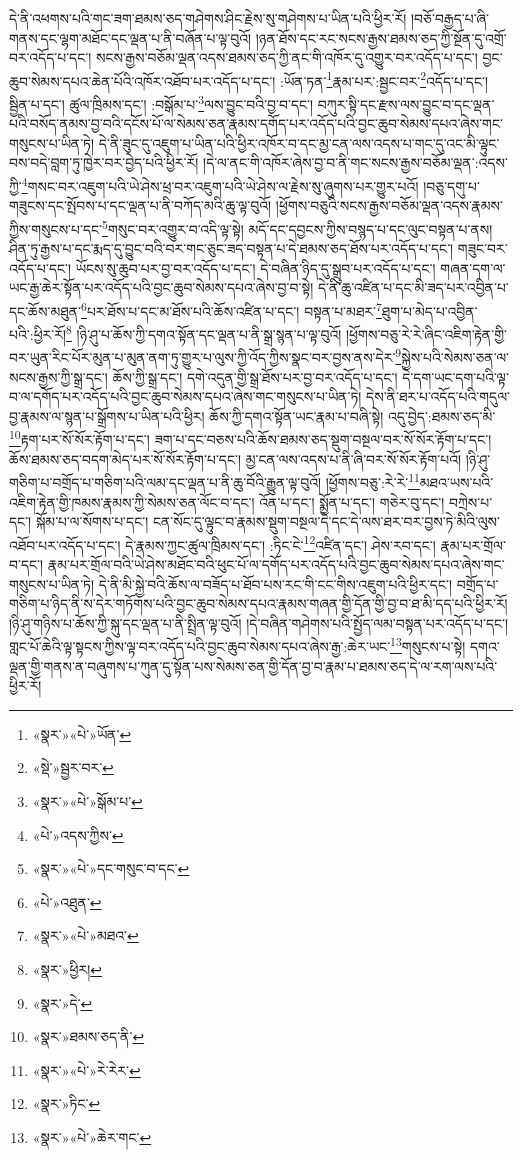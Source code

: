 དེ་ནི་འཕགས་པའི་གང་ཟག་ཐམས་ཅད་གཤེགས་ཤིང་རྗེས་སུ་གཤེགས་པ་ཡིན་པའི་ཕྱིར་རོ། །བཅོ་བརྒྱད་པ་ཞི་གནས་དང་ལྷག་མཐོང་དང་ལྡན་པ་ནི་བཞོན་པ་ལྟ་བུའོ། །ཉན་ཐོས་དང་རང་སངས་རྒྱས་ཐམས་ཅད་ཀྱི་སྔོན་དུ་འགྲོ་བར་འདོད་པ་དང་། སངས་རྒྱས་བཅོམ་ལྡན་འདས་ཐམས་ཅད་ཀྱི་ནང་གི་འཁོར་དུ་འགྱུར་བར་འདོད་པ་དང་། བྱང་ཆུབ་སེམས་དཔའ་ཆེན་པོའི་འཁོར་འཐོབ་པར་འདོད་པ་དང་། :ཡོན་ཏན་\footnote{«སྣར་»«པེ་»ཡོན་}རྣམ་པར་:སྦྱང་བར་\footnote{«སྡེ་»སྦྱར་བར་}འདོད་པ་དང་། སྦྱིན་པ་དང་། ཚུལ་ཁྲིམས་དང་། :བསྒོམ་པ་\footnote{«སྣར་»«པེ་»སྒོམ་པ་}ལས་བྱུང་བའི་བྱ་བ་དང་། བཀུར་སྟི་དང་རྫས་ལས་བྱུང་བ་དང་ལྡན་པའི་བསོད་ནམས་བྱ་བའི་དངོས་པོ་ལ་སེམས་ཅན་རྣམས་དགོད་པར་འདོད་པའི་བྱང་ཆུབ་སེམས་དཔའ་ཞེས་གང་གསུངས་པ་ཡིན་ཏེ། དེ་ནི་ཟུང་དུ་འཇུག་པ་ཡིན་པའི་ཕྱིར་འཁོར་བ་དང་མྱ་ངན་ལས་འདས་པ་གང་དུ་འང་མི་ལྟུང་བས་བདེ་བླག་ཏུ་ཁྱེར་བར་བྱེད་པའི་ཕྱིར་རོ། །དེ་ལ་ནང་གི་འཁོར་ཞེས་བྱ་བ་ནི་གང་སངས་རྒྱས་བཅོམ་ལྡན་:འདས་ཀྱི་\footnote{«པེ་»འདས་ཀྱིས་}གསང་བར་འཇུག་པའི་ཡེ་ཤེས་ཕྲ་བར་འཇུག་པའི་ཡེ་ཤེས་ལ་རྗེས་སུ་ཞུགས་པར་གྱུར་པའོ། །བཅུ་དགུ་པ་གཟུངས་དང་སྤོབས་པ་དང་ལྡན་པ་ནི་བཀོད་མའི་ཆུ་ལྟ་བུའོ། །ཕྱོགས་བཅུའི་སངས་རྒྱས་བཅོམ་ལྡན་འདས་རྣམས་ཀྱིས་གསུངས་པ་དང་\footnote{«སྣར་»«པེ་»དང་གསུང་བ་དང་}གསུང་བར་འགྱུར་བ་འདི་ལྟ་སྟེ། མདོ་དང་དབྱངས་ཀྱིས་བསྙད་པ་དང་ལུང་བསྟན་པ་ནས། ཤིན་ཏུ་རྒྱས་པ་དང་རྨད་དུ་བྱུང་བའི་བར་གང་ཅུང་ཟད་བསྟན་པ་དེ་ཐམས་ཅད་ཐོས་པར་འདོད་པ་དང་། གཟུང་བར་འདོད་པ་དང་། ཡོངས་སུ་ཆུབ་པར་བྱ་བར་འདོད་པ་དང་། དེ་བཞིན་ཉིད་དུ་སྒྲུབ་པར་འདོད་པ་དང་། གཞན་དག་ལ་ཡང་རྒྱ་ཆེར་སྟོན་པར་འདོད་པའི་བྱང་ཆུབ་སེམས་དཔའ་ཞེས་བྱ་བ་སྟེ། དེ་ནི་ཆུ་འཛིན་པ་དང་མི་ཟད་པར་འབྱིན་པ་དང་ཆོས་མཐུན་\footnote{«པེ་»འཐུན་}པར་ཐོས་པ་དང་མ་ཐོས་པའི་ཆོས་འཛིན་པ་དང་། བསྟན་པ་མཐར་\footnote{«སྣར་»«པེ་»མཐའ་}ཐུག་པ་མེད་པ་འབྱིན་པའི་:ཕྱིར་རོ།\footnote{«སྣར་»ཕྱིར།} །ཉི་ཤུ་པ་ཆོས་ཀྱི་དགའ་སྟོན་དང་ལྡན་པ་ནི་སྒྲ་སྙན་པ་ལྟ་བུའོ། །ཕྱོགས་བཅུ་རེ་རེ་ཞིང་འཇིག་རྟེན་གྱི་བར་ཡུན་རིང་པོར་མུན་པ་མུན་ནག་ཏུ་གྱུར་པ་ལུས་ཀྱི་འོད་ཀྱིས་སྣང་བར་བྱས་ནས་དེར་\footnote{«སྣར་»དེ་}སྐྱེས་པའི་སེམས་ཅན་ལ་སངས་རྒྱས་ཀྱི་སྒྲ་དང་། ཆོས་ཀྱི་སྒྲ་དང་། དགེ་འདུན་གྱི་སྒྲ་ཐོས་པར་བྱ་བར་འདོད་པ་དང་། དེ་དག་ཡང་དག་པའི་ལྟ་བ་ལ་དགོད་པར་འདོད་པའི་བྱང་ཆུབ་སེམས་དཔའ་ཞེས་གང་གསུངས་པ་ཡིན་ཏེ། དེས་ནི་ཐར་པ་འདོད་པའི་གདུལ་བྱ་རྣམས་ལ་སྙན་པ་སྒྲོགས་པ་ཡིན་པའི་ཕྱིར། ཆོས་ཀྱི་དགའ་སྟོན་ཡང་རྣམ་པ་བཞི་སྟེ། འདུ་བྱེད་:ཐམས་ཅད་མི་\footnote{«སྣར་»ཐམས་ཅད་ནི་}རྟག་པར་སོ་སོར་རྟོག་པ་དང་། ཟག་པ་དང་བཅས་པའི་ཆོས་ཐམས་ཅད་སྡུག་བསྔལ་བར་སོ་སོར་རྟོག་པ་དང་། ཆོས་ཐམས་ཅད་བདག་མེད་པར་སོ་སོར་རྟོག་པ་དང་། མྱ་ངན་ལས་འདས་པ་ནི་ཞི་བར་སོ་སོར་རྟོག་པའོ། །ཉི་ཤུ་གཅིག་པ་བགྲོད་པ་གཅིག་པའི་ལམ་དང་ལྡན་པ་ནི་ཆུ་བོའི་རྒྱུན་ལྟ་བུའོ། །ཕྱོགས་བཅུ་:རེ་རེ་\footnote{«སྣར་»«པེ་»རེ་རེར་}མཐའ་ཡས་པའི་འཇིག་རྟེན་གྱི་ཁམས་རྣམས་ཀྱི་སེམས་ཅན་ལོང་བ་དང་། འོན་པ་དང་། སྨྱོན་པ་དང་། གཅེར་བུ་དང་། བཀྲེས་པ་དང་། སྐོམ་པ་ལ་སོགས་པ་དང་། ངན་སོང་དུ་ལྟུང་བ་རྣམས་སྡུག་བསྔལ་དེ་དང་དེ་ལས་ཐར་བར་བྱས་ཏེ་མིའི་ལུས་འཐོབ་པར་འདོད་པ་དང་། དེ་རྣམས་ཀྱང་ཚུལ་ཁྲིམས་དང་། :ཏིང་ངེ་\footnote{«སྣར་»ཏིང་}འཛིན་དང་། ཤེས་རབ་དང་། རྣམ་པར་གྲོལ་བ་དང་། རྣམ་པར་གྲོལ་བའི་ཡེ་ཤེས་མཐོང་བའི་ཕུང་པོ་ལ་དགོད་པར་འདོད་པའི་བྱང་ཆུབ་སེམས་དཔའ་ཞེས་གང་གསུངས་པ་ཡིན་ཏེ། དེ་ནི་མི་སྐྱེ་བའི་ཆོས་ལ་བཟོད་པ་ཐོབ་པས་རང་གི་ངང་གིས་འཇུག་པའི་ཕྱིར་དང་། བགྲོད་པ་གཅིག་པ་ཉིད་ནི་ས་དེར་གཏོགས་པའི་བྱང་ཆུབ་སེམས་དཔའ་རྣམས་གཞན་གྱི་དོན་གྱི་བྱ་བ་ཐ་མི་དད་པའི་ཕྱིར་རོ། །ཉི་ཤུ་གཉིས་པ་ཆོས་ཀྱི་སྐུ་དང་ལྡན་པ་ནི་སྤྲིན་ལྟ་བུའོ། །དེ་བཞིན་གཤེགས་པའི་སྤྱོད་ལམ་བསྟན་པར་འདོད་པ་དང་། གླང་པོ་ཆེའི་ལྟ་སྟངས་ཀྱིས་ལྟ་བར་འདོད་པའི་བྱང་ཆུབ་སེམས་དཔའ་ཞེས་རྒྱ་:ཆེར་ཡང་\footnote{«སྣར་»«པེ་»ཆེར་གང་}གསུངས་པ་སྟེ། དགའ་ལྡན་གྱི་གནས་ན་བཞུགས་པ་ཀུན་དུ་སྟོན་པས་སེམས་ཅན་གྱི་དོན་བྱ་བ་རྣམ་པ་ཐམས་ཅད་དེ་ལ་རག་ལས་པའི་ཕྱིར་རོ། 